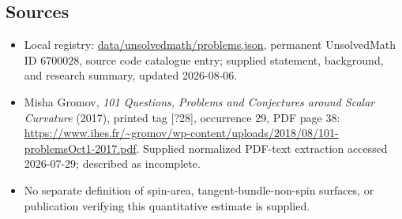 \documentclass[11pt]{article}
\begin{document}
\subsection{Sources}
\begin{itemize}
\item Local registry: \url{data/unsolvedmath/problems.json}, permanent UnsolvedMath ID \(6700028\), source code catalogue entry; supplied statement, background, and research summary, updated 2026-08-06.
\item Misha Gromov, \emph{101 Questions, Problems and Conjectures around Scalar Curvature} (2017), printed tag [?28], occurrence 29, PDF page 38: \url{https://www.ihes.fr/~gromov/wp-content/uploads/2018/08/101-problemsOct1-2017.pdf}. Supplied normalized PDF-text extraction accessed 2026-07-29; described as incomplete.
\item No separate definition of spin-area, tangent-bundle-non-spin surfaces, or publication verifying this quantitative estimate is supplied.
\end{itemize}
\end{document}
